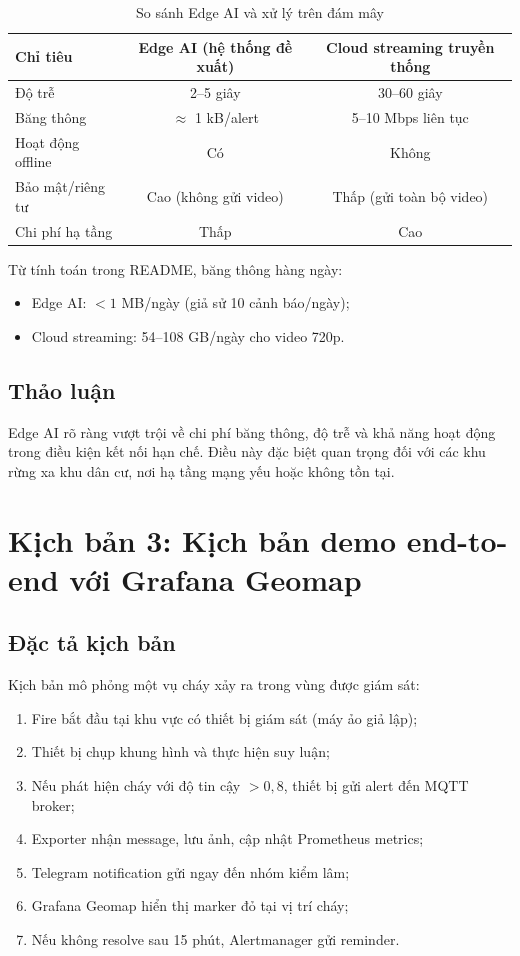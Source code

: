 \documentclass[12pt,a4paper]{report}
\begin{document}
\begin{table}[h]
  \centering
  \caption{So sánh Edge AI và xử lý trên đám mây}
  \begin{tabular}{lcc}
    \toprule
    Chỉ tiêu & Edge AI (hệ thống đề xuất) & Cloud streaming truyền thống \\
    \midrule
    Độ trễ & 2--5 giây & 30--60 giây \\
    Băng thông & $\approx$ 1 kB/alert & 5--10 Mbps liên tục \\
    Hoạt động offline & Có & Không \\
    Bảo mật/riêng tư & Cao (không gửi video) & Thấp (gửi toàn bộ video) \\
    Chi phí hạ tầng & Thấp & Cao \\
    \bottomrule
  \end{tabular}
\end{table}

Từ tính toán trong README, băng thông hàng ngày:
\begin{itemize}
  \item Edge AI: $< 1$ MB/ngày (giả sử 10 cảnh báo/ngày);
  \item Cloud streaming: 54--108 GB/ngày cho video 720p.
\end{itemize}

\subsection{Thảo luận}

Edge AI rõ ràng vượt trội về chi phí băng thông, độ trễ và khả năng hoạt động trong điều kiện kết nối hạn chế. Điều này đặc biệt quan trọng đối với các khu rừng xa khu dân cư, nơi hạ tầng mạng yếu hoặc không tồn tại.

\section{Kịch bản 3: Kịch bản demo end-to-end với Grafana Geomap}

\subsection{Đặc tả kịch bản}

Kịch bản mô phỏng một vụ cháy xảy ra trong vùng được giám sát:
\begin{enumerate}
  \item Fire bắt đầu tại khu vực có thiết bị giám sát (máy ảo giả lập);
  \item Thiết bị chụp khung hình và thực hiện suy luận;
  \item Nếu phát hiện cháy với độ tin cậy $> 0{,}8$, thiết bị gửi alert đến MQTT broker;
  \item Exporter nhận message, lưu ảnh, cập nhật Prometheus metrics;
  \item Telegram notification gửi ngay đến nhóm kiểm lâm;
  \item Grafana Geomap hiển thị marker đỏ tại vị trí cháy;
  \item Nếu không resolve sau 15 phút, Alertmanager gửi reminder.
\end{enumerate}
\end{document}
